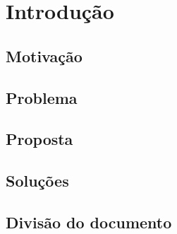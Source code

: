 \chapter{Introdução}
\label{chap:introduction}


\section{Motivação}


\section{Problema}


\section{Proposta}


\section{Soluções}


\section{Divisão do documento}
